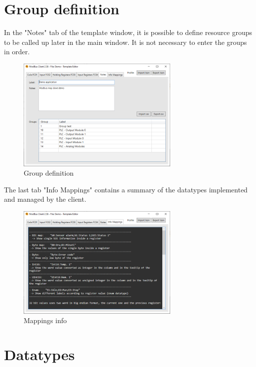 \section{Group definition}

In the "Notes" tab of the template window, it is possible to define resource groups
to be called up later in the main window. It is not necessary to enter the groups in order.

\begin{figure}[H]
\centering
\includegraphics[width=0.70\textwidth]{../Img/ModBus_Client_Template_Group_Definition.PNG}
\caption{Group definition}
\end{figure}

The last tab "Info Mappings" contains a summary of the datatypes implemented and managed by the client.

\begin{figure}[H]
\centering
\includegraphics[width=0.70\textwidth]{../Img/ModBus_Client_Template_Info_Mappings.PNG}
\caption{Mappings info}
\end{figure}

\newpage
\section{Datatypes}

